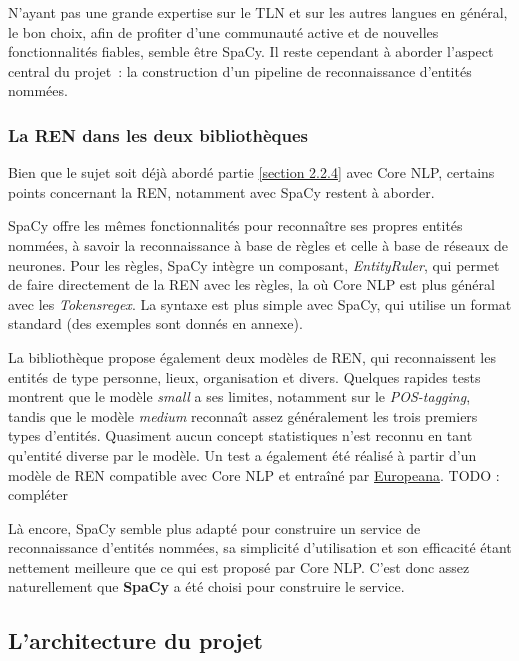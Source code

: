 N'ayant pas une grande expertise sur le TLN et sur les autres langues en général, le bon choix, afin de profiter d'une communauté active et de nouvelles fonctionnalités fiables, semble être SpaCy. Il reste cependant à aborder l'aspect central du projet~: la construction d'un pipeline de reconnaissance d'entités nommées.
\label{section 3.1.3}

\subsubsection{La REN dans les deux bibliothèques}
Bien que le sujet soit déjà abordé partie \ref{section 2.2.4} avec Core NLP, certains points concernant la REN, notamment avec SpaCy restent à aborder. 
\newline

SpaCy offre les mêmes fonctionnalités pour reconnaître ses propres entités nommées, à savoir la reconnaissance à base de règles et celle à base de réseaux de neurones. Pour les règles, SpaCy intègre un composant, \textit{EntityRuler}, qui permet de faire directement de la REN avec les règles, la où Core NLP est plus général avec les \textit{Tokensregex}. La syntaxe est plus simple avec SpaCy, qui utilise un format standard (des exemples sont donnés en annexe).
\newline

La bibliothèque propose également deux modèles de REN, qui reconnaissent les entités de type personne, lieux, organisation et divers. Quelques rapides tests montrent que le modèle \textit{small} a ses limites, notamment sur le \textit{POS-tagging}, tandis que le modèle \textit{medium} reconnaît assez généralement les trois premiers types d'entités. Quasiment aucun concept statistiques n'est reconnu en tant qu'entité diverse par le modèle. Un test a également été réalisé à partir d'un modèle de REN compatible avec Core NLP et entraîné par \href{http://lab.kbresearch.nl/static/html/eunews.html}{Europeana}. TODO : compléter
\newline

Là encore, SpaCy semble plus adapté pour construire un service de reconnaissance d'entités nommées, sa simplicité d'utilisation et son efficacité étant nettement meilleure que ce qui est proposé par Core NLP. C'est donc assez naturellement que \textbf{SpaCy} a été choisi pour construire le service. 
\label{section 3.1.4}

\subsection{L'architecture du projet}

